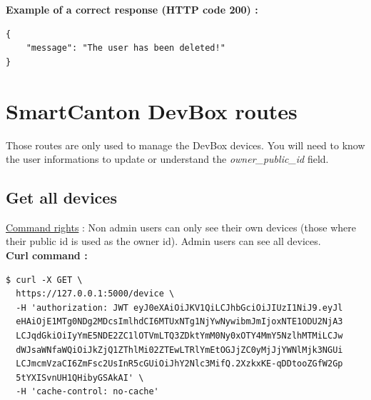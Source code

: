 \textbf{Example of a correct response (HTTP code 200) : }

\begin{tcolorbox}[top=-3mm, bottom=-3mm, left=0mm, right=0mm, enhanced, breakable, colback=LightGray, colframe=DarkGray, colbacktitle=DarkGray]
\begin{verbatim}
{
    "message": "The user has been deleted!"
}
\end{verbatim}
\end{tcolorbox}

\section{SmartCanton DevBox routes}
Those routes are only used to manage the DevBox devices. You will need to know the user informations to update or understand the \textit{owner\_public\_id} field. 
\subsection{Get all devices}
\underline{Command rights} : Non admin users can only see their own devices (those where their public id is used as the owner id). Admin users can see all devices.\\

\textbf{Curl command :}

\begin{tcolorbox}[top=-3mm, bottom=-3mm, left=0mm, right=0mm, enhanced, breakable, colback=LightGray, colframe=DarkGray, colbacktitle=DarkGray]
\begin{verbatim}
$ curl -X GET \
  https://127.0.0.1:5000/device \
  -H 'authorization: JWT eyJ0eXAiOiJKV1QiLCJhbGciOiJIUzI1NiJ9.eyJl
  eHAiOjE1MTg0NDg2MDcsImlhdCI6MTUxNTg1NjYwNywibmJmIjoxNTE1ODU2NjA3
  LCJqdGkiOiIyYmE5NDE2ZC1lOTVmLTQ3ZDktYmM0Ny0xOTY4MmY5NzlhMTMiLCJw
  dWJsaWNfaWQiOiJkZjQ1ZThlMi02ZTEwLTRlYmEtOGJjZC0yMjJjYWNlMjk3NGUi
  LCJmcmVzaCI6ZmFsc2UsInR5cGUiOiJhY2Nlc3MifQ.2XzkxKE-qDDtooZGfW2Gp
  5tYXISvnUH1QHibyGSAkAI' \
  -H 'cache-control: no-cache' 
\end{verbatim}
\end{tcolorbox}

